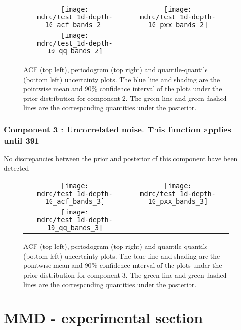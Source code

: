 \documentclass{article} %
\begin{document}
\begin{figure}[H]
\newcommand{\wmgd}{0.5\columnwidth}
\newcommand{\hmgd}{3.0cm}
\newcommand{\mdrd}{test_1d-depth-10}
\newcommand{\mbm}{\hspace{-0.3cm}}
\begin{tabular}{cc}
\mbm \texttt{[image: \\mdrd/test\_1d-depth-10\_acf\_bands\_2]} & \texttt{[image: \\mdrd/test\_1d-depth-10\_pxx\_bands\_2]} \\
\mbm \texttt{[image: \\mdrd/test\_1d-depth-10\_qq\_bands\_2]}
\end{tabular}
\caption{
ACF (top left), periodogram (top right) and quantile-quantile (bottom left) uncertainty plots.
The blue line and shading are the pointwise mean and 90\% confidence interval of the plots under the prior distribution for component 2.
The green line and green dashed lines are the corresponding quantities under the posterior.}
\label{fig:check2}
\end{figure}

\subsubsection{Component 3 : Uncorrelated noise. This function applies until  391}

No discrepancies between the prior and posterior of this component have been detected

\begin{figure}[H]
\newcommand{\wmgd}{0.5\columnwidth}
\newcommand{\hmgd}{3.0cm}
\newcommand{\mdrd}{test_1d-depth-10}
\newcommand{\mbm}{\hspace{-0.3cm}}
\begin{tabular}{cc}
\mbm \texttt{[image: \\mdrd/test\_1d-depth-10\_acf\_bands\_3]} & \texttt{[image: \\mdrd/test\_1d-depth-10\_pxx\_bands\_3]} \\
\mbm \texttt{[image: \\mdrd/test\_1d-depth-10\_qq\_bands\_3]}
\end{tabular}
\caption{
ACF (top left), periodogram (top right) and quantile-quantile (bottom left) uncertainty plots.
The blue line and shading are the pointwise mean and 90\% confidence interval of the plots under the prior distribution for component 3.
The green line and green dashed lines are the corresponding quantities under the posterior.}
\label{fig:check3}
\end{figure}

\section{MMD - experimental section}
\label{sec:mmd}
\end{document}
